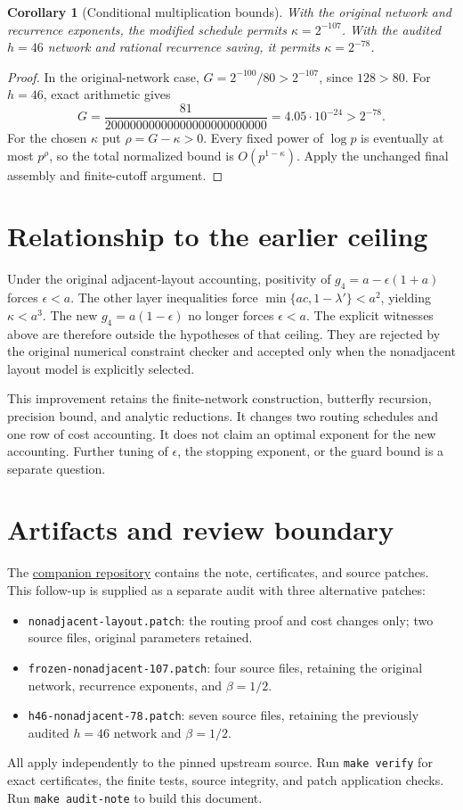 \documentclass[11pt]{article}
\newtheorem{corollary}[proposition]{Corollary}
\begin{document}
\begin{corollary}[Conditional multiplication bounds]
With the original network and recurrence exponents, the modified schedule
permits $\kappa=2^{-107}$. With the audited $h=46$ network and rational
recurrence saving, it permits $\kappa=2^{-78}$.
\end{corollary}
\begin{proof}
In the original-network case,
$G=2^{-100}/80>2^{-107}$, since $128>80$.
For $h=46$, exact arithmetic gives
\[
 G=\frac{81}{20000000000000000000000000}
   =4.05\cdot10^{-24}>2^{-78}.
\]
For the chosen $\kappa$ put $\rho=G-\kappa>0$. Every fixed power of
$\log p$ is eventually at most $p^\rho$, so the total normalized bound is
$O(p^{1-\kappa})$. Apply the unchanged final assembly and finite-cutoff argument.
\end{proof}

\section{Relationship to the earlier ceiling}
Under the original adjacent-layout accounting, positivity of
$g_4=a-\epsilon(1+a)$ forces $\epsilon<a$. The other layer inequalities
force $\min\{ac,1-\lambda'\}<a^2$, yielding $\kappa<a^3$.
The new $g_4=a(1-\epsilon)$ no longer forces $\epsilon<a$.
The explicit witnesses above are therefore outside the hypotheses of that
ceiling. They are rejected by the original numerical constraint checker and
accepted only when the nonadjacent layout model is explicitly selected.

This improvement retains the finite-network construction, butterfly recursion,
precision bound, and analytic reductions. It changes two routing schedules and
one row of cost accounting. It does not claim an optimal exponent for the new
accounting. Further tuning of $\epsilon$, the stopping exponent, or the guard
bound is a separate question.

\section{Artifacts and review boundary}
The \href{https://github.com/CrocSwap/integer-mult-bounds}{companion repository}
contains the note, certificates, and source patches.
This follow-up is supplied as a separate audit with three alternative patches:
\begin{itemize}
\item \texttt{nonadjacent-layout.patch}: the routing proof and cost changes only;
  two source files, original parameters retained.
\item \texttt{frozen-nonadjacent-107.patch}: four source files, retaining the
  original network, recurrence exponents, and $\beta=1/2$.
\item \texttt{h46-nonadjacent-78.patch}: seven source files, retaining the
  previously audited $h=46$ network and $\beta=1/2$.
\end{itemize}
All apply independently to the pinned upstream source. Run \texttt{make verify}
for exact certificates, the finite tests, source integrity, and patch application
checks. Run \texttt{make audit-note} to build this document.
\end{document}
